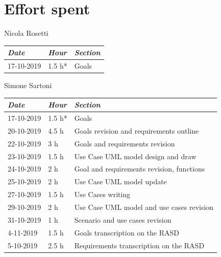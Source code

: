 \documentclass[a4paper]{report}
\begin{document}
\restoregeometry

\chapter{Effort spent}

\begin{center}
Nicola Rosetti \\
\begin{tabular}{p{2cm}p{1.5cm}p{7cm}}
\toprule
\textit{Date} & \textit{Hour} & \textit{Section} \\ \midrule
17-10-2019 & 1.5 h* & Goals \\
\bottomrule
\end{tabular}
\end{center}
\vspace*{1 cm}
\begin{center}
Simone Sartoni \\
\begin{tabular}{p{2cm}p{1.5cm}p{7cm}}
\toprule
\textit{Date} & \textit{Hour} & \textit{Section} \\ \midrule
17-10-2019 & 1.5 h* & Goals \\ \midrule
20-10-2019 & 4.5 h & Goals revision and requirements outline  \\ \midrule
22-10-2019 & 3 h & Goals and requirements revision \\ \midrule
23-10-2019 & 1.5 h & Use Case UML model design and draw \\ \midrule
24-10-2019 & 2 h & Goal and requirements revision, functions \\ \midrule
25-10-2019 & 2 h & Use Case UML model update \\ \midrule
27-10-2019 & 1.5 h & Use Cases writing \\ \midrule
29-10-2019 & 2 h & Use Case UML model and use cases revision \\ \midrule
31-10-2019 & 1 h & Scenario and use cases revision \\ \midrule
4-11-2019 & 1.5 h & Goals transcription on the RASD \\ \midrule
5-10-2019 & 2.5 h & Requirements transcription on the RASD \\ \midrule
\bottomrule
\end{tabular}
\end{center}
\vspace*{1 cm}
\end{document}
